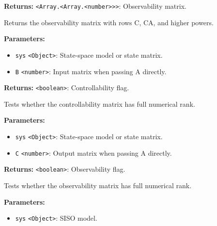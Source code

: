 \documentclass[12pt,a4paper]{article}
\begin{document}
\noindent \textbf{Returns:} \texttt{<Array.<Array.<number>>>}: Observability matrix.

\noindent Returns the observability matrix with rows C, CA, and higher powers.

\vspace{5mm}
\noindent {}


\noindent \textbf{Parameters:}
\begin{itemize}
  \item \texttt{sys} \texttt{<Object>}: State-space model or state matrix.
  \item \texttt{B} \texttt{<number>}: Input matrix when passing A directly.
\end{itemize}

\noindent \textbf{Returns:} \texttt{<boolean>}: Controllability flag.

\noindent Tests whether the controllability matrix has full numerical rank.

\vspace{5mm}
\noindent {}


\noindent \textbf{Parameters:}
\begin{itemize}
  \item \texttt{sys} \texttt{<Object>}: State-space model or state matrix.
  \item \texttt{C} \texttt{<number>}: Output matrix when passing A directly.
\end{itemize}

\noindent \textbf{Returns:} \texttt{<boolean>}: Observability flag.

\noindent Tests whether the observability matrix has full numerical rank.

\vspace{5mm}
\noindent {}


\noindent \textbf{Parameters:}
\begin{itemize}
  \item \texttt{sys} \texttt{<Object>}: SISO model.
\end{itemize}
\end{document}

